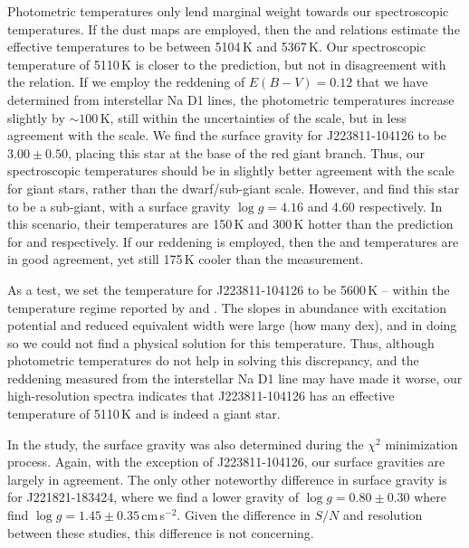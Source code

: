 \documentclass{emulateapj}
\begin{document}
Photometric temperatures only lend marginal weight towards our spectroscopic temperatures. If the \citet{schlegel;et-al_1998} dust maps are employed, then the \citet{alonso;et-al_1999} and \citet{casagrande;et-al_2010} relations estimate the effective temperatures to be between 5104\,K and 5367\,K. Our spectroscopic temperature of 5110\,K is closer to the \citet{alonso;et-al_1999} prediction, but not in disagreement with the \citet{casagrande;et-al_2010} relation. If we employ the reddening of $E(B-V) = 0.12$ that we have determined from interstellar Na D1 lines, the photometric temperatures increase slightly by ${\sim}100$\,K, still within the uncertainties of the \citet{alonso;et-al_1999} scale, but in less agreement with the \citet{casagrande;et-al_2010} scale. We find the surface gravity for J223811-104126 to be $3.00 \pm 0.50$, placing this star at the base of the red giant branch. Thus, our spectroscopic temperatures should be in slightly better agreement with the \citet{alonso;et-al_1999} scale for giant stars, rather than the \citet{casagrande;et-al_2010} dwarf/sub-giant scale. However, \citet{williams;et-al_2011} and \citet{wylie-de-boer;et-al_2012} find this star to be a sub-giant, with a surface gravity $\log{g} = 4.16$ and 4.60 respectively. In this scenario, their temperatures are 150\,K and 300\,K hotter than the \citet{casagrande;et-al_2010} prediction for \citet{williams;et-al_2011} and \citet{wylie-de-boer;et-al_2012} respectively. If our reddening is employed, then the \citet{williams;et-al_2011} and \citet{casagrande;et-al_2010} temperatures are in good agreement, yet still 175\,K cooler than the \citet{wylie-de-boer;et-al_2012} measurement.

As a test, we set the temperature for J223811-104126 to be 5600\,K -- within the temperature regime reported by \citet{williams;et-al_2011} and \citet{wylie-de-boer;et-al_2012}. The slopes in abundance with excitation potential and reduced equivalent width were large (how many dex), and in doing so we could not find a physical solution for this temperature. Thus, although photometric temperatures do not help in solving this discrepancy, and the reddening measured from the interstellar Na D1 line may have made it worse, our high-resolution spectra  indicates that J223811-104126 has an effective temperature of 5110\,K and is indeed a giant star.

In the \citet{wylie-de-boer;et-al_2012} study, the surface gravity was also determined during the $\chi^2$ minimization process. Again, with the exception of J223811-104126, our surface gravities are largely in agreement. The only other noteworthy difference in surface gravity is for J221821-183424, where we find a lower gravity of $\log{g} = 0.80 \pm 0.30$ where \citet{wylie-de-boer;et-al_2012} find $\log{g} = 1.45 \pm 0.35$\,cm\,s$^{-2}$. Given the difference in $S/N$ and resolution between these studies, this difference is not concerning. 
\end{document}
